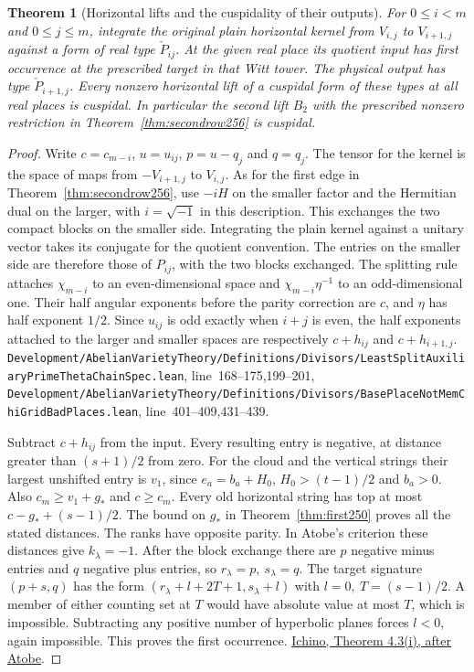 \documentclass[a4paper,11pt]{article}
\newtheorem{theorem}[proposition]{Theorem}
\theoremstyle{definition}
\theoremstyle{remark}
\newcommand{\srcloc}[2]{{\small\nolinkurl{#1.lean}}, line~#2}
\numberwithin{equation}{section}
\begin{document}
\begin{theorem}[Horizontal lifts and the cuspidality of their outputs]\leavevmode
\label{thm:realrow257}
For \(0\le i<m\) and \(0\le j\le m\), integrate the original
plain horizontal kernel from \(V_{i,j}\) to \(V_{i+1,j}\) against a
form of real type \(\check P_{ij}\). At the given real place its
quotient input has first occurrence at the prescribed target in
that Witt tower. The physical output has type \(\check P_{i+1,j}\).
Every nonzero horizontal lift of a cuspidal form of these types
at all real places is cuspidal. In particular the second lift
\(B_2\) with the prescribed nonzero restriction in
Theorem~\ref{thm:secondrow256} is cuspidal.
\end{theorem}
\begin{proof}
Write \(c=c_{m-i}\), \(u=u_{ij}\), \(p=u-q_j\) and \(q=q_j\).
The tensor for the kernel is the space of maps from
\(-V_{i+1,j}\) to \(V_{i,j}\). As for the first edge in
Theorem~\ref{thm:secondrow256}, use \(-iH\) on the smaller factor
and the Hermitian dual on the larger, with \(i=\sqrt{-1}\) in
this description. This exchanges the two compact blocks on the
smaller side. Integrating the plain kernel against a unitary
vector takes its conjugate for the quotient convention. The
entries on the smaller side are therefore those of \(P_{ij}\),
with the two blocks exchanged. The splitting rule attaches
\(\chi_{m-i}\) to an even-dimensional space and
\(\chi_{m-i}\eta^{-1}\) to an odd-dimensional one. Their half
angular exponents before the parity correction are \(c\), and
\(\eta\) has half exponent \(1/2\). Since \(u_{ij}\) is odd
exactly when \(i+j\) is even, the half exponents attached to the
larger and smaller spaces are respectively \(c+h_{ij}\) and
\(c+h_{i+1,j}\).
\srcloc{Development/AbelianVarietyTheory/Definitions/Divisors/LeastSplitAuxiliaryPrimeThetaChainSpec}{168--175,199--201},
\srcloc{Development/AbelianVarietyTheory/Definitions/Divisors/BasePlaceNotMemChiGridBadPlaces}{401--409,431--439}.

Subtract \(c+h_{ij}\) from the input. Every resulting entry is
negative, at distance greater than \((s+1)/2\) from zero. For
the cloud and the vertical strings their largest unshifted entry
is \(v_1\), since \(e_a=b_a+H_0\), \(H_0>(t-1)/2\) and \(b_a>0\).
Also \(c_m\ge v_1+g_*\) and \(c\ge c_m\). Every old horizontal
string has top at most \(c-g_*+(s-1)/2\). The bound on \(g_*\)
in Theorem~\ref{thm:first250} proves all the stated distances.
The ranks have opposite parity. In Atobe's criterion these
distances give \(k_\lambda=-1\). After the block exchange there
are \(p\) negative minus entries and \(q\) negative plus entries,
so \(r_\lambda=p,\ s_\lambda=q\). The target signature
\((p+s,q)\) has the form
\((r_\lambda+l+2T+1,s_\lambda+l)\) with \(l=0,\ T=(s-1)/2\).
A member of either counting set at \(T\) would have absolute
value at most \(T\), which is impossible. Subtracting any
positive number of hyperbolic planes forces \(l<0\), again
impossible. This proves the first occurrence.
\href{https://arxiv.org/pdf/2002.09148}{Ichino, Theorem 4.3(i),
after Atobe}.


\end{proof}
\end{document}

